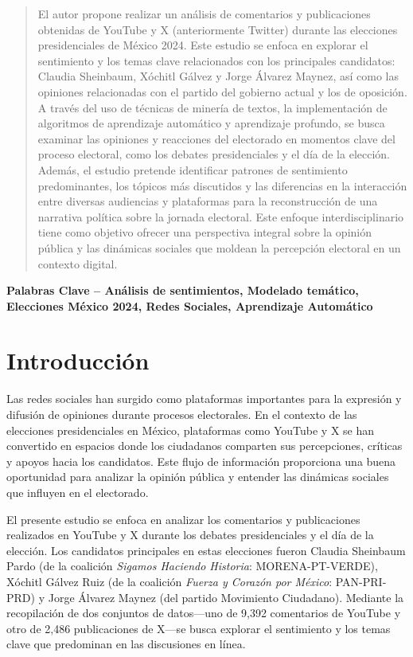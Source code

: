 \documentclass[10pt, a4paper]{article}
\begin{document}
	\newpage
	\maketitle
	\thispagestyle{fancy}
	\begin{abstract}
		El autor propone realizar un análisis de comentarios y publicaciones obtenidas de YouTube y X (anteriormente Twitter) durante las elecciones presidenciales de México 2024. Este estudio se enfoca en explorar el sentimiento y los temas clave relacionados con los principales candidatos: Claudia Sheinbaum, Xóchitl Gálvez y Jorge Álvarez Maynez, así como las opiniones relacionadas con el partido del gobierno actual y los de oposición. A través del uso de técnicas de minería de textos, la implementación de algoritmos de aprendizaje automático y aprendizaje profundo, se busca examinar las opiniones y reacciones del electorado en momentos clave del proceso electoral, como los debates presidenciales y el día de la elección. Además, el estudio pretende identificar patrones de sentimiento predominantes, los tópicos más discutidos y las diferencias en la interacción entre diversas audiencias y plataformas para la reconstrucción de una narrativa política sobre la jornada electoral. Este enfoque interdisciplinario tiene como objetivo ofrecer una perspectiva integral sobre la opinión pública y las dinámicas sociales que moldean la percepción electoral en un contexto digital.
	\end{abstract}
	
	\textbf{Palabras Clave -- Análisis de sentimientos, Modelado temático, Elecciones México 2024, Redes Sociales, Aprendizaje Automático}{\mykeywords}
	
	\section{Introducción}
	Las redes sociales han surgido como plataformas importantes para la expresión y difusión de opiniones durante procesos electorales. En el contexto de las elecciones presidenciales en México, plataformas como YouTube y X se han convertido en espacios donde los ciudadanos comparten sus percepciones, críticas y apoyos hacia los candidatos. Este flujo de información proporciona una buena oportunidad para analizar la opinión pública y entender las dinámicas sociales que influyen en el electorado.
	
	El presente estudio se enfoca en analizar los comentarios y publicaciones realizados en YouTube y X durante los debates presidenciales y el día de la elección. Los candidatos principales en estas elecciones fueron Claudia Sheinbaum Pardo (de la coalición \textit{Sigamos Haciendo Historia}: MORENA-PT-VERDE), Xóchitl Gálvez Ruiz (de la coalición \textit{Fuerza y Corazón por México}: PAN-PRI-PRD) y Jorge Álvarez Maynez (del partido Movimiento Ciudadano). Mediante la recopilación de dos conjuntos de datos—uno de 9,392 comentarios de YouTube y otro de 2,486 publicaciones de X—se busca explorar el sentimiento y los temas clave que predominan en las discusiones en línea.
	
\end{document}
